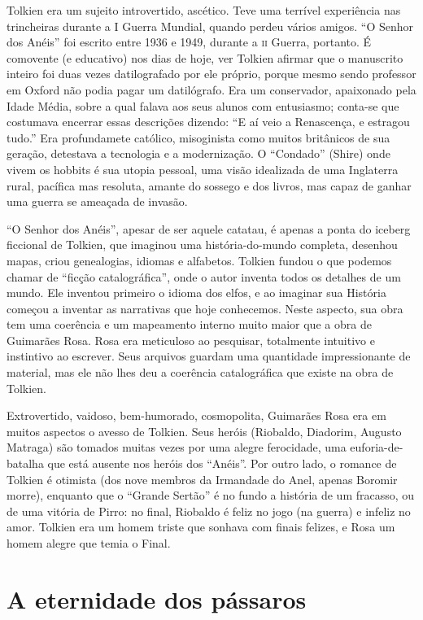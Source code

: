 Tolkien era um sujeito introvertido, ascético. Teve uma terrível
experiência nas trincheiras durante a I Guerra Mundial, quando perdeu
vários amigos. “O Senhor dos Anéis” foi escrito entre 1936 e 1949,
durante a \textsc{ii} Guerra, portanto. É comovente (e educativo) nos dias de
hoje, ver Tolkien afirmar que o manuscrito inteiro foi duas vezes
datilografado por ele próprio, porque mesmo sendo professor em Oxford
não podia pagar um datilógrafo. Era um conservador, apaixonado pela
Idade Média, sobre a qual falava aos seus alunos com entusiasmo;
conta-se que costumava encerrar essas descrições dizendo: “E aí veio
a Renascença, e estragou tudo.” Era profundamete católico,
misoginista como muitos britânicos de sua geração, detestava a
tecnologia e a modernização. O “Condado” (Shire) onde vivem os
hobbits é sua utopia pessoal, uma visão idealizada de uma Inglaterra
rural, pacífica mas resoluta, amante do sossego e dos livros, mas
capaz de ganhar uma guerra se ameaçada de invasão. 

“O Senhor dos Anéis”, apesar de ser aquele catatau, é apenas a ponta
do iceberg ficcional de Tolkien, que imaginou uma história-do-mundo
completa, desenhou mapas, criou genealogias, idiomas e alfabetos.
Tolkien fundou o que podemos chamar de “ficção catalográfica”, onde o
autor inventa todos os detalhes de um mundo. Ele inventou primeiro o
idioma dos elfos, e ao imaginar sua História começou a inventar as
narrativas que hoje conhecemos. Neste aspecto, sua obra tem uma
coerência e um mapeamento interno muito maior que a obra de Guimarães
Rosa. Rosa era meticuloso ao pesquisar, totalmente intuitivo e
instintivo ao escrever. Seus arquivos guardam uma quantidade
impressionante de material, mas ele não lhes deu a coerência
catalográfica que existe na obra de Tolkien. 

Extrovertido, vaidoso, bem-humorado, cosmopolita, Guimarães Rosa era
em muitos aspectos o avesso de Tolkien. Seus heróis (Riobaldo,
Diadorim, Augusto Matraga) são tomados muitas vezes por uma alegre
ferocidade, uma euforia-de-batalha que está ausente nos heróis dos
“Anéis”. Por outro lado, o romance de Tolkien é otimista (dos nove
membros da Irmandade do Anel, apenas Boromir morre), enquanto que o
“Grande Sertão” é no fundo a história de um fracasso, ou de uma
vitória de Pirro: no final, Riobaldo é feliz no jogo (na guerra) e
infeliz no amor. Tolkien era um homem triste que sonhava com finais
felizes, e Rosa um homem alegre que temia o Final.

\chapter{A eternidade dos pássaros}

